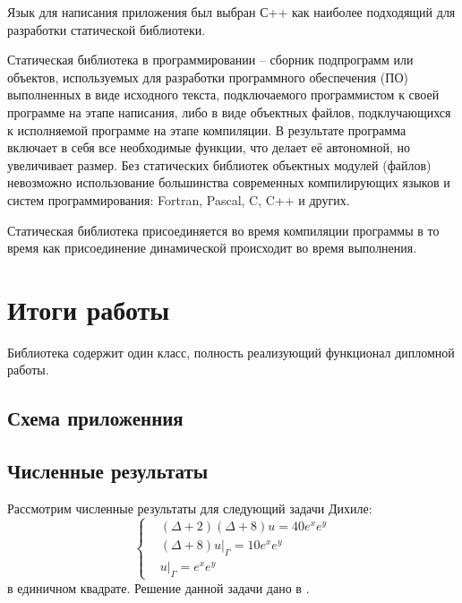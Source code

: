 Язык для написания приложения был выбран С++ как наиболее подходящий для разработки статической библиотеки.

Статическая библиотека в программировании -- сборник подпрограмм или объектов, используемых для разработки программного обеспечения (ПО) выполненных в виде исходного текста, подключаемого программистом к своей программе на этапе написания, либо в виде объектных файлов, подклучающихся к исполняемой программе на этапе компиляции. В результате программа включает в себя все необходимые функции, что делает её автономной, но увеличивает размер. Без статических библиотек объектных модулей (файлов) невозможно использование большинства современных компилирующих языков и систем программирования: Fortran, Pascal, C, C++ и других.

Статическая библиотека присоединяется во время компиляции программы в то время как присоединение динамической происходит во время выполнения.

\chapter{Итоги работы}
Библиотека содержит один класс, полность реализующий функционал дипломной работы.  
\section{Схема приложенния}
\begin{spacing}{0.9}

\end{spacing}

\section{Численные результаты}
Рассмотрим численные результаты для следующий задачи Дихиле:
\begin{equation} 
	\left\{
\begin{aligned}
& (\Delta + 2) (\Delta +8) u = 40e^{x}e^{y}\\ & (\Delta +8) u|_{\Gamma} = 10e^{x}e^{y}\\&u|_{\Gamma} = e^{x}e^{y}
\end{aligned}
 \right. \end{equation}
{}
в единичном квадрате. Решение данной задачи дано в \cite{luk:dis}.

